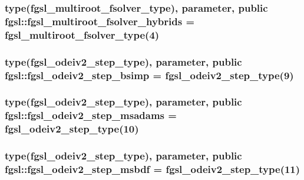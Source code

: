 \subsubsection[{fgsl\+\_\+multiroot\+\_\+fsolver\+\_\+hybrids}]{\setlength{\rightskip}{0pt plus 5cm}type({\bf fgsl\+\_\+multiroot\+\_\+fsolver\+\_\+type}), parameter, public fgsl\+::fgsl\+\_\+multiroot\+\_\+fsolver\+\_\+hybrids = {\bf fgsl\+\_\+multiroot\+\_\+fsolver\+\_\+type}(4)}\label{namespacefgsl_abd283e94024c75208f98eb64fd4a8833}
\hypertarget{namespacefgsl_a6c2cfecdf8c9901ed22feb4c9fdef384}{}
\subsubsection[{fgsl\+\_\+odeiv2\+\_\+step\+\_\+bsimp}]{\setlength{\rightskip}{0pt plus 5cm}type({\bf fgsl\+\_\+odeiv2\+\_\+step\+\_\+type}), parameter, public fgsl\+::fgsl\+\_\+odeiv2\+\_\+step\+\_\+bsimp = {\bf fgsl\+\_\+odeiv2\+\_\+step\+\_\+type}(9)}\label{namespacefgsl_a6c2cfecdf8c9901ed22feb4c9fdef384}
\hypertarget{namespacefgsl_a2cdba04e438cd75d8a78612215dcc5bc}{}
\subsubsection[{fgsl\+\_\+odeiv2\+\_\+step\+\_\+msadams}]{\setlength{\rightskip}{0pt plus 5cm}type({\bf fgsl\+\_\+odeiv2\+\_\+step\+\_\+type}), parameter, public fgsl\+::fgsl\+\_\+odeiv2\+\_\+step\+\_\+msadams = {\bf fgsl\+\_\+odeiv2\+\_\+step\+\_\+type}(10)}\label{namespacefgsl_a2cdba04e438cd75d8a78612215dcc5bc}
\hypertarget{namespacefgsl_a125bb5f7c78cd4dda6b7a957e8867653}{}
\subsubsection[{fgsl\+\_\+odeiv2\+\_\+step\+\_\+msbdf}]{\setlength{\rightskip}{0pt plus 5cm}type({\bf fgsl\+\_\+odeiv2\+\_\+step\+\_\+type}), parameter, public fgsl\+::fgsl\+\_\+odeiv2\+\_\+step\+\_\+msbdf = {\bf fgsl\+\_\+odeiv2\+\_\+step\+\_\+type}(11)}\label{namespacefgsl_a125bb5f7c78cd4dda6b7a957e8867653}
\hypertarget{namespacefgsl_ae903b3c5e98a84868123fcf7f45cdf11}{}
